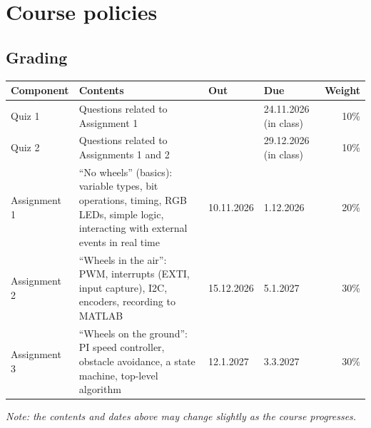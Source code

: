 \documentclass[11pt,a4paper]{article}
\begin{document}
\section{Course policies}

\subsection{Grading}

\noindent
\begin{tabularx}{\textwidth}{@{}l L l l r@{}}
\toprule
Component & Contents & Out & Due & Weight \\
\midrule
Quiz 1 & Questions related to Assignment 1
  & & 24.11.2026 (in class) & 10\% \\
Quiz 2 & Questions related to Assignments 1 and 2 & & 29.12.2026 (in class) & 10\% \\
Assignment 1 & ``No wheels'' (basics): variable types, bit operations, timing, RGB LEDs, simple logic, interacting
  with external events in real time
  & 10.11.2026 & 1.12.2026 & 20\% \\
Assignment 2 & ``Wheels in the air'': PWM, interrupts (EXTI, input capture), I2C, encoders, recording to MATLAB & 15.12.2026 & 5.1.2027 & 30\% \\
Assignment 3 & ``Wheels on the ground'': PI speed controller, obstacle avoidance, a state machine, top-level algorithm & 12.1.2027 & 3.3.2027 & 30\% \\
\bottomrule
\end{tabularx}

\smallskip\noindent
\textit{Note: the contents and dates above may change slightly as the course progresses.}
\end{document}
